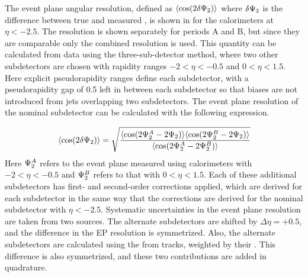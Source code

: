 The event plane angular resolution, defined as $\langle \cos(2 \delta \Psi_{2}) \rangle$ where $\delta \Psi_{2}$ is the difference between true and measured \psit, is shown in  for the calorimeters at $\eta < -2.5$.
The resolution is shown separately for periods A and B, but since they are comparable only the combined resolution is used.
This quantity can be calculated from data using the three-sub-detector method, where two other subdetectors are chosen with rapidity ranges $-2 < \eta< -0.5$ and $0 < \eta < 1.5$.
Here explicit pseudorapidity ranges define each subdetector, with a pseudorapidity gap of 0.5 left in between each subdetector so that biases are not introduced from jets overlapping two subdetectors.
The event plane resolution of the nominal subdetector can be calculated with the following expression.

\begin{equation}
\langle \cos(2 \delta \Psi_{2}) \rangle = \sqrt{ \frac{\langle \cos(2\Psi_{2}^A - 2\Psi_{2}) \rangle \langle \cos(2\Psi_{2}^B - 2\Psi_{2}) \rangle }{\langle \cos(2\Psi_{2}^A - 2\Psi_{2}^B) \rangle} }\\
\end{equation}
Here $\Psi_{2}^A$ refers to the event plane measured using calorimeters with $-2 < \eta< -0.5$ and $\Psi_{2}^B$ refers to that with $0 < \eta < 1.5$.
Each of these additional subdetectors has first- and second-order corrections applied, which are derived for each subdetector in the same way that the corrections are derived for the nominal subdetector with $\eta < -2.5$.
Systematic uncertainties in the event plane resolution are taken from two sources.
The alternate subdetectors are shifted by $\Delta\eta = +0.5$, and the difference in the EP resolution is symmetrized.
Also, the alternate subdetectors are calculated using the \qt from tracks, weighted by their \pt. This difference is also symmetrized, and these two contributions are added in quadrature.

